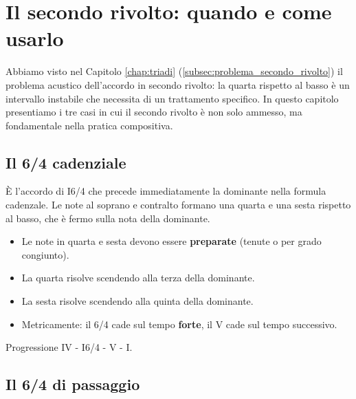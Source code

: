 \chapter{Il secondo rivolto: quando e come usarlo}
\label{chap:quarta_sesta}

Abbiamo visto nel Capitolo \ref{chap:triadi} (\ref{subsec:problema_secondo_rivolto}) il problema acustico dell'accordo in secondo rivolto: la quarta rispetto al basso è un intervallo instabile che necessita di un trattamento specifico. In questo capitolo presentiamo i tre casi in cui il secondo rivolto è non solo ammesso, ma fondamentale nella pratica compositiva.

\section{Il 6/4 cadenziale}
\label{sec:cadenziale}

\begin{definizione}[6/4 cadenziale]
    È l'accordo di I6/4 che precede immediatamente la dominante nella formula cadenzale. Le note al soprano e contralto formano una quarta e una sesta rispetto al basso, che è fermo sulla nota della dominante.
\end{definizione}

\begin{regola}
    \begin{itemize}
        \item Le note in quarta e sesta devono essere \textbf{preparate} (tenute o per grado congiunto).
        \item La quarta risolve scendendo alla terza della dominante.
        \item La sesta risolve scendendo alla quinta della dominante.
        \item Metricamente: il 6/4 cade sul tempo \textbf{forte}, il V cade sul tempo successivo.
    \end{itemize}
\end{regola}

\begin{esempio}
    Progressione IV - I6/4 - V - I.

\end{esempio}

\section{Il 6/4 di passaggio}
\label{sec:64_passaggio}

